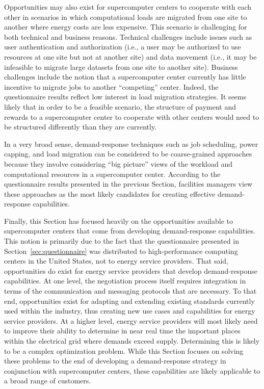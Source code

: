 Opportunities may also exist for supercomputer centers to cooperate
with each other in scenarios in which computational loads are migrated
from one site to another where energy costs are less expensive.  This
scenario is challenging for both technical and business reasons.
Technical challenges include issues such as user authentication and
authorization (i.e., a user may be authorized to use resources at one
site but not at another site) and data movement (i.e., it may be
infeasible to migrate large datasets from one site to another site).
Business challenges include the notion that a supercomputer center
currently has little incentive to migrate jobs to another ``competing''
center.  Indeed, the questionnaire results reflect low interest in
load migration strategies.  It seems likely that in order to be a
feasible scenario, the structure of payment and rewards to a
supercomputer center to cooperate with other centers would need to
be structured differently than they are currently.

In a very broad sense, demand-response techniques such as job scheduling,
power capping, and load migration can be considered to be coarse-grained
approaches because they involve considering ``big picture'' views of the
workload and computational resources in a supercomputer center.  According
to the questionnaire results presented in the previous Section, facilities
managers view these approaches as the most likely candidates for creating
effective demand-response capabilities.

Finally, this Section has focused heavily on the opportunities available
to supercomputer centers that come from developing demand-response
capabilities.  This notion is primarily due to the fact that the
questionnaire presented in Section~\ref{sec:questionnaire} was
distributed to high-performance computing centers in the United
States, not to energy service providers.  That said, opportunities do
exist for energy service providers that develop demand-response
capabilities.  At one level, the negotiation process itself requires
integration in terms of the communication and messaging protocols that
are necessary.  To that end, opportunities exist for adapting and extending
existing standards currently used within the industry, thus creating new
use cases and capabilities for energy service providers.  At a higher
level, energy service providers will most likely need to improve their
ability to determine in near real time the important places within the
electrical grid where demands exceed supply.  Determining this is likely
to be a complex optimization problem.  While this Section focuses on
solving these problems to the end of developing a demand-response
strategy in conjunction with supercomputer centers, these capabilities
are likely applicable to a broad range of customers.


